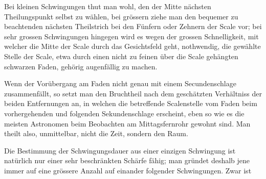 Bei kleinen Schwingungen thut man wohl, den der Mitte nächsten Theilungspunkt selbst zu wählen, bei grössern ziehe man den bequemer zu beachtenden nächsten Theilstrich bei den Fünfern oder Zehnern der Scale vor; bei sehr grossen Schwingungen hingegen wird es wegen der grossen Schnelligkeit, mit welcher die Mitte der Scale durch das Gesichtsfeld geht, nothwendig, die gewählte Stelle der Scale, etwa durch einen nicht zu feinen über die Scale gehängten schwarzen Faden, gehörig augenfällig zu machen.

Wenn der Vorübergang am Faden nicht genau mit einem Secundenschlage zusammenfällt, so setzt man den Bruchtheil nach dem geschätzten Verhältniss der beiden Entfernungen an, in welchen die betreffende Scalenstelle vom Faden beim vorhergehenden und folgenden Sekundenschlage erscheint, eben so wie es die meisten Astronomen beim Beobachten am Mittagsfernrohr gewohnt sind. Man theilt also, unmittelbar, nicht die Zeit, sondern den Raum.

Die Bestimmung der Schwingungsdauer aus einer einzigen Schwingung ist natürlich nur einer sehr beschränkten Schärfe fähig; man gründet deshalb jene immer auf eine grössere Anzahl auf einander folgender Schwingungen. Zwar ist
